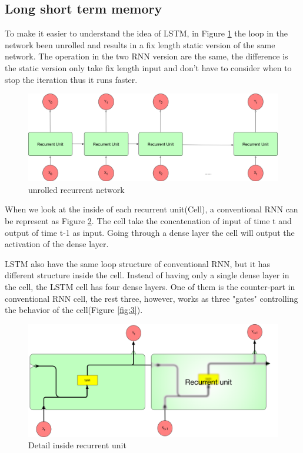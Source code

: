 \subsection{Long short term memory}
To make it easier to understand the idea of LSTM, in Figure \ref{fig:1} the loop in the network been unrolled and results in a fix length static version of the same network. The operation in the two RNN version are the same, the difference is the static version only take fix length input and don't have to consider when to stop the iteration thus it runs faster.\par
\begin{figure}[h] 
	\centering
	\includegraphics[width=6.0in]{Figures/recurrent2}
	\caption[unrolled recurrent network]{unrolled recurrent network}
	\label{fig:1}
\end{figure}

When we look at the inside of each recurrent unit(Cell), a conventional RNN can be represent as Figure \ref{fig:2}. The cell take the concatenation of input of time t and output of time t-1 as input. Going through a dense layer the cell will output the activation of the dense layer.\par  

LSTM also have the same loop structure of conventional RNN, but it has different structure inside the cell. Instead of having only a single dense layer in the cell, the LSTM cell has four dense layers. One of them is the counter-part in conventional RNN cell, the rest three, however, works as three "gates" controlling the behavior of the cell(Figure \ref{fig:3}).\par 


\begin{figure}[h] 
	\centering
	\includegraphics[width=6.0in]{Figures/recurrent3}
	\caption[Detail inside recurrent unit]{Detail inside recurrent unit}
	\label{fig:2}
\end{figure}

